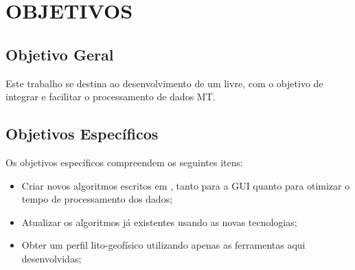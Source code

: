 \chapter{OBJETIVOS}

	\section{Objetivo Geral}
        Este trabalho se destina ao desenvolvimento de um  livre, com o objetivo de integrar e facilitar o processamento de dados MT.
    
    \section{Objetivos Específicos}
        
        Os objetivos específicos compreendem os seguintes itens:
        
        \begin{itemize}
            \item Criar novos algoritmos escritos em \Python, tanto para a GUI quanto para otimizar o tempo de processamento dos dados;
            \item Atualizar os algoritmos já existentes usando as novas tecnologias;
            \item Obter um perfil lito-geofísico utilizando apenas as ferramentas aqui desenvolvidas;
        \end{itemize}
